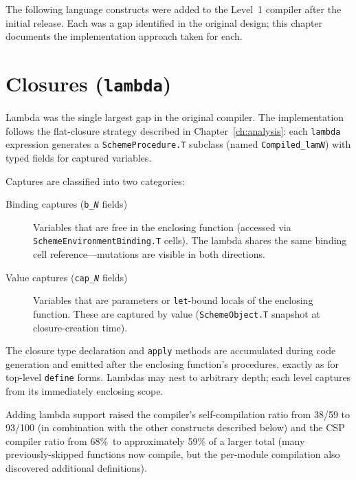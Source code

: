 \documentclass[12pt]{report}
\begin{document}
The following language constructs were added to the Level~1 compiler
after the initial release.  Each was a gap identified in the original
design; this chapter documents the implementation approach taken
for each.

\section{Closures (\texttt{lambda})}
\label{sec:gap-lambda}

Lambda was the single largest gap in the original compiler.
The implementation follows the flat-closure strategy described
in Chapter~\ref{ch:analysis}: each \texttt{lambda} expression
generates a \texttt{SchemeProcedure.T} subclass (named
\texttt{Compiled\_lam\emph{N}}) with typed fields for captured
variables.

Captures are classified into two categories:

\begin{description}
\item[Binding captures (\texttt{b\_\emph{N}} fields)]
  Variables that are free in the enclosing function (accessed via
  \texttt{SchemeEnvironmentBinding.T} cells).  The lambda shares
  the same binding cell reference---mutations are visible in both
  directions.

\item[Value captures (\texttt{cap\_\emph{N}} fields)]
  Variables that are parameters or \texttt{let}-bound locals of
  the enclosing function.  These are captured by value
  (\texttt{SchemeObject.T} snapshot at closure-creation time).
\end{description}

The closure type declaration and \texttt{apply} methods are
accumulated during code generation and emitted after the
enclosing function's procedures, exactly as for top-level
\texttt{define} forms.  Lambdas may nest to arbitrary depth;
each level captures from its immediately enclosing scope.

Adding lambda support raised the compiler's self-compilation
ratio from 38/59 to 93/100 (in combination with the other
constructs described below) and the CSP compiler ratio
from 68\%\ to approximately 59\% of a larger total
(many previously-skipped functions now compile, but the
per-module compilation also discovered additional definitions).
\end{document}
